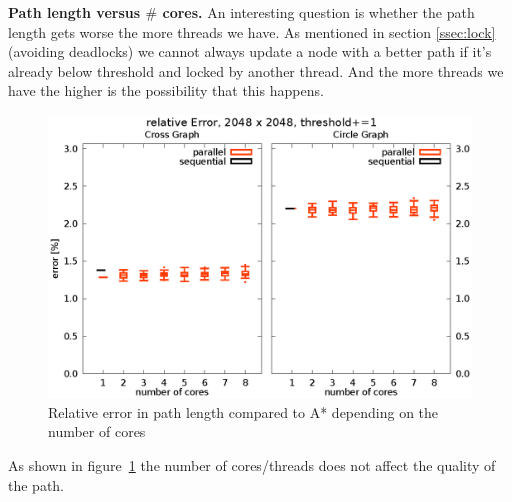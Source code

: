 \documentclass[letterpaper]{article}
\newcommand{\mypar}[1]{{\bf #1.}}
\begin{document}
\mypar{Path length versus $\#$ cores}
An interesting question is whether the path length gets worse the more threads we have. As mentioned in section \ref{ssec:lock} (avoiding deadlocks) we cannot always update a node with a better path if it's already below threshold and locked by another thread. And the more threads we have the higher is the possibility that this happens.
\begin{figure}[h]\centering
  \includegraphics[scale=0.558]{error_cores.eps}
  \caption{Relative error in path length compared to A* depending on the number of cores\label{fig:error_cores}}
\end{figure}
As shown in figure~\ref{fig:error_cores} the number of cores/threads does not affect the quality of the path.
\end{document}
